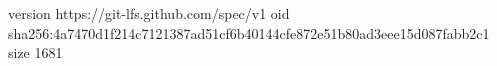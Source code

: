 version https://git-lfs.github.com/spec/v1
oid sha256:4a7470d1f214c7121387ad51cf6b40144cfe872e51b80ad3eee15d087fabb2c1
size 1681
